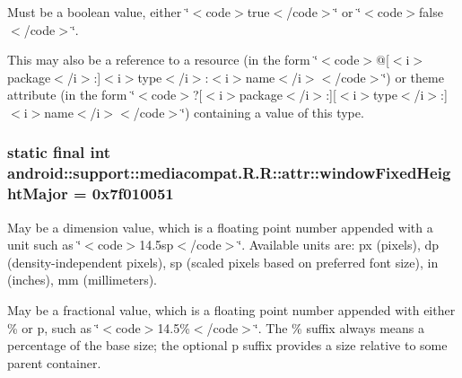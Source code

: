 Must be a boolean value, either \char`\"{}$<$code$>$true$<$/code$>$\char`\"{} or \char`\"{}$<$code$>$false$<$/code$>$\char`\"{}. 

This may also be a reference to a resource (in the form \char`\"{}$<$code$>$@\mbox{[}$<$i$>$package$<$/i$>$:\mbox{]}$<$i$>$type$<$/i$>$:$<$i$>$name$<$/i$>$$<$/code$>$\char`\"{}) or theme attribute (in the form \char`\"{}$<$code$>$?\mbox{[}$<$i$>$package$<$/i$>$:\mbox{]}\mbox{[}$<$i$>$type$<$/i$>$:\mbox{]}$<$i$>$name$<$/i$>$$<$/code$>$\char`\"{}) containing a value of this type. \hypertarget{classandroid_1_1support_1_1mediacompat_1_1_r_1_1attr_7d8c2a1d063fca57b55c26ae896a6bf2}{
\subsubsection[{windowFixedHeightMajor}]{\setlength{\rightskip}{0pt plus 5cm}static final int android::support::mediacompat.R.R::attr::windowFixedHeightMajor = 0x7f010051}}
\label{classandroid_1_1support_1_1mediacompat_1_1_r_1_1attr_7d8c2a1d063fca57b55c26ae896a6bf2}


May be a dimension value, which is a floating point number appended with a unit such as \char`\"{}$<$code$>$14.5sp$<$/code$>$\char`\"{}. Available units are: px (pixels), dp (density-independent pixels), sp (scaled pixels based on preferred font size), in (inches), mm (millimeters). 

May be a fractional value, which is a floating point number appended with either \% or p, such as \char`\"{}$<$code$>$14.5\%$<$/code$>$\char`\"{}. The \% suffix always means a percentage of the base size; the optional p suffix provides a size relative to some parent container. 

